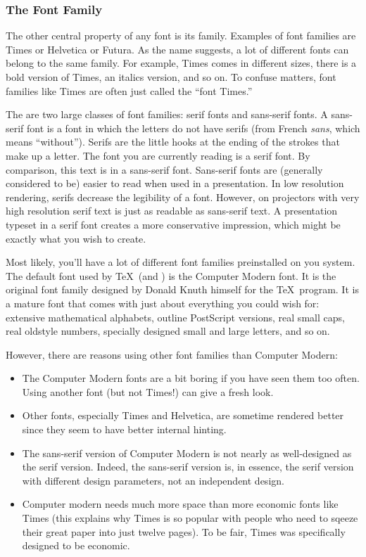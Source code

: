 \subsubsection{The Font Family}

The other central property of any font is its family. Examples of font
families are Times or Helvetica or Futura. As the name suggests, a lot
of different fonts can belong to the same family. For example, Times
comes in different sizes, there is a bold version of Times, an
italics version, and so on. To confuse matters, font families like
Times are often just called the ``font Times.''

The are two large classes of font families: serif fonts and
sans-serif fonts. A sans-serif font is a font in
which the letters do not have serifs (from French \emph{sans}, which
means ``without''). Serifs are the little hooks at the ending of the
strokes that make up a letter. The font you are currently reading is a
serif font. \textsf{By comparison, this text is in a sans-serif font.}
Sans-serif fonts are (generally considered to be) easier to read
when used in a presentation. In low resolution rendering, serifs
decrease the legibility of a font. However, on projectors with very
high resolution serif text is just as readable as sans-serif text. A
presentation typeset in a serif font creates a more conservative
impression, which might be exactly what you wish to create. 

Most likely, you'll have a lot of different font families preinstalled
on you system. The default font used by \TeX\ (and \beamer) is the
Computer Modern font. It  is the original font family designed by Donald
Knuth himself for the \TeX\ program. It is a mature font that comes
with just about everything you could wish for: extensive mathematical
alphabets, outline PostScript versions, real small caps, real oldstyle
numbers, specially designed small and large letters, and so on.

However, there are reasons using other font families than Computer
Modern: 
\begin{itemize}
\item
  The Computer Modern fonts are a bit boring if you have seen them too
  often. Using another font (but not Times!) can give a fresh look.
\item
  Other fonts, especially Times and Helvetica, are sometime rendered
  better since they seem to have better internal hinting.
\item
  The sans-serif version of Computer Modern is not nearly as
  well-designed as the serif version. Indeed, the sans-serif version
  is, in essence, the serif version with different design parameters,
  not an independent design.
\item
  Computer modern needs much more space than more economic fonts like
  Times (this explains why Times is so popular with people who need
  to sqeeze their great paper into just twelve pages). To be fair,
  Times was specifically designed to be economic.
\end{itemize}


